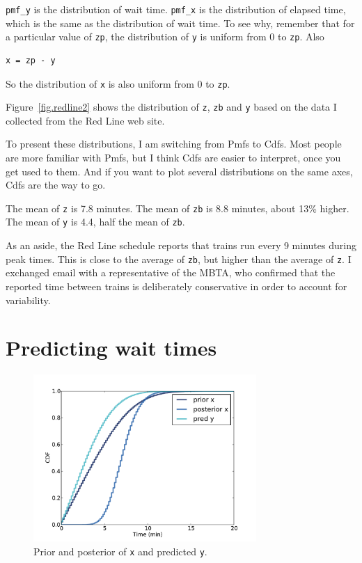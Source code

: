 \documentclass[12pt]{book}
\begin{document}
\verb"pmf_y" is the distribution of wait time.  \verb"pmf_x" is the
distribution of elapsed time, which is the same as the distribution of
wait time.  To see why, remember that for a particular value of
{\tt zp}, the distribution of {\tt y} is uniform from 0 to {\tt zp}.
Also
%
\begin{verbatim}
x = zp - y
\end{verbatim}
%
So the distribution of {\tt x} is also uniform from 0 to {\tt zp}.

Figure~\ref{fig.redline2} shows the distribution of {\tt z}, {\tt zb}
and {\tt y} based on the data I collected from the Red Line web site.

To present these distributions, I am switching from Pmfs to Cdfs.
Most people are more familiar with Pmfs, but I think Cdfs are easier
to interpret, once you get used to them.  And if you want to plot
several distributions on the same axes, Cdfs are the way to go.

The mean of {\tt z} is 7.8 minutes.  The mean of {\tt zb} is 8.8
minutes, about 13\% higher.  The mean of {\tt y} is 4.4, half
the mean of {\tt zb}.

As an aside, the Red Line schedule reports that trains run every
9 minutes during peak times.  This is close to the average of
{\tt zb}, but higher than the average of {\tt z}.  I exchanged email
with a representative of the MBTA, who confirmed that the reported
time between trains is deliberately conservative in order to
account for variability.


\section{Predicting wait times}
\label{elapsed}

\begin{figure}
\centerline{\includegraphics[height=2.5in]{figs/redline3.pdf}}
\caption{Prior and posterior of {\tt x} and predicted {\tt y}. }
\label{fig.redline3}
\end{figure}
\end{document}
